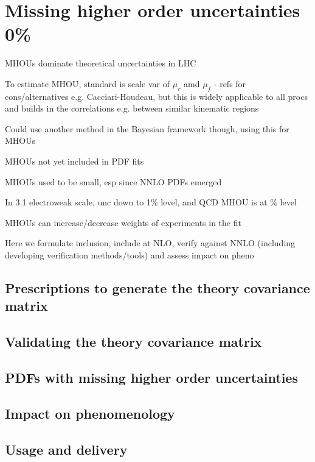 \chapter{Missing higher order uncertainties 0\%}
\bi 
\item MHOUs dominate theoretical uncertainties in LHC
\item To estimate MHOU, standard is scale var of $\mu_r$ amd $\mu_f$ - refs for cons/alternatives e.g. Cacciari-Houdeau, but this is widely applicable to all procs and builds in the correlations e.g. between similar kinematic regions
\item Could use another method in the Bayesian framework though, using this for MHOUs
\item MHOUs not yet included in PDF fits
\item MHOUs used to be small, esp since NNLO PDFs emerged
\item In 3.1 electroweak scale, unc down to 1\% level, and QCD MHOU is at \% level
\item MHOUs can increase/decrease weights of experiments in the fit
\item Here we formulate inclusion, include at NLO, verify against NNLO (including developing verification methods/tools) and assess impact on pheno
\ei
\section{Prescriptions to generate the theory covariance matrix}

\section{Validating the theory covariance matrix}
\section{PDFs with missing higher order uncertainties}
\section{Impact on phenomenology}
\section{Usage and delivery}
